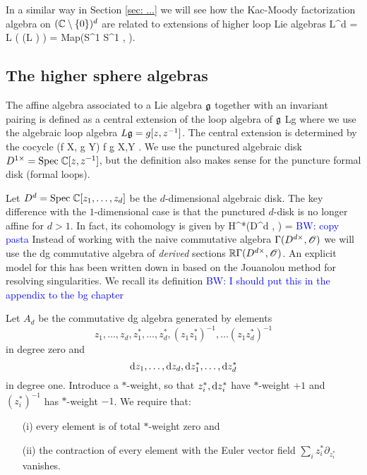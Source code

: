 \documentclass[10pt]{amsart}
\def\brian{\textcolor{blue}{BW: }\textcolor{blue}}
\begin{document}
In a similar way in Section \ref{sec: ...} we will see how the Kac-Moody factorization algebra on $(\mathbb C \setminus \{0\})^d$ are related to extensions of higher loop Lie algebras
\ben
L^d \fg = L ( \cdots (L \fg) \cdots ) = {\rm Map}(S^{1} \times S^1 , \fg).
\een


\subsection{The higher sphere algebras}

The affine algebra associated to a Lie algebra $\mathfrak g$ together with an invariant pairing is defined as a central extension of the loop algebra of $\mathfrak g$
\ben
\CC \to \Hat{\fg} \to Lg 
\een
where we use the algebraic loop algebra $L\mathfrak g = g [z,z^{-1}]$.
The central extension is determined by the cocycle 
\ben
(f \tensor X, g \tensor Y) \mapsto \oint f \d g \<X,Y\> .
\een 
We use the punctured algebraic disk $D^{1\times} = {\rm Spec} \;  \mathbb C [z,z^{-1}]$, but the definition also makes sense for the puncture formal disk (formal loops). 

Let $D^d = {\rm Spec} \; \mathbb C[z_1,\ldots, z_d]$ be the $d$-dimensional algebraic disk.
The key difference with the $1$-dimensional case is that the punctured $d$-disk is no longer affine for $d > 1$.
In fact, its cohomology is given by
\ben
H^*(D^{d \times}, \sO) = \brian{copy pasta}
\een
Instead of working with the naive commutative algebra $\Gamma(D^{d \times}, \mathscr O)$ we will use the dg commutative algebra of {\em derived} sections $\mathbb R \Gamma(D^{d \times}, \mathscr O)$. 
An explicit model for this has been written down in \cite{FHK} based on the Jouanolou method for resolving singularities. 
We recall its definition \brian{I should put this in the appendix to the bg chapter}

\begin{dfn} Let $A_d$ be the commutative dg algebra generated by elements $$z_1,\ldots,z_d, z_1^*,\ldots,z_d^*, (z_1 z_1^*)^{-1}, \ldots (z_1z_d^*)^{-1}$$ in degree zero and $${\rm d} z_1,\ldots , {\rm d} z_d, {\rm d} z_1^*,\ldots, {\rm d} z_d^*$$ in degree one.
Introduce a $*$-weight, so that $z_i^*, {\rm d} z_i^*$ have $*$-weight $+1$ and $(z_i^*)^{-1}$ has $*$-weight $-1$.
We require that:
\begin{itemize}
\item[(i)] every element is of total $*$-weight zero and
\item[(ii)] the contraction of every element with the Euler vector field $\sum_{i} z_i^* \partial_{z_{i}^*}$ vanishes.
\end{itemize}
\end{dfn}
\end{document}
